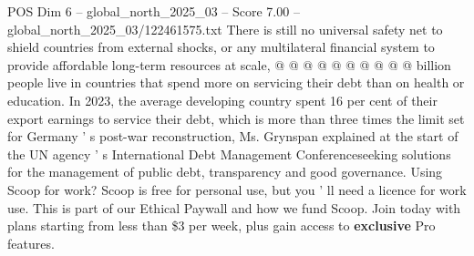 \begin{textsample}{POS Dim 6 – global\_north\_2025\_03 – Score 7.00 – global\_north\_2025\_03/122461575.txt}
There is still no universal safety net to shield countries from external shocks, or any multilateral financial system to provide affordable long-term resources at scale, @ @ @ @ @ @ @ @ @ @ billion people live in countries that spend more on servicing their debt than on health or education.
In 2023, the average developing country spent 16 per cent of their export earnings to service their debt, which is more than three times the limit set for Germany ' s post-war reconstruction, Ms.
Grynspan explained at the start of the UN agency ' s International Debt Management Conferenceseeking solutions for the management of public debt, transparency and good governance.
Using Scoop for work?
Scoop is free for personal use, but you ' ll need a licence for work use.
This is part of our Ethical Paywall and how we fund Scoop.
Join today with plans starting from less than \$3 per week, plus gain access to \textbf{exclusive} Pro features.

\end{textsample}
